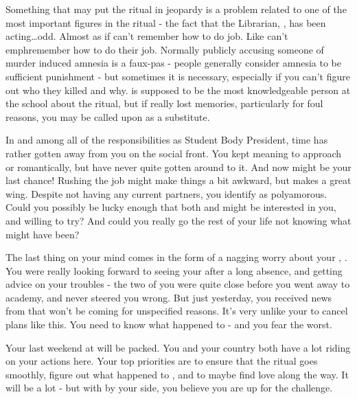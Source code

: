 \documentclass[char]{GL2020}
\begin{document}
Something that may put the ritual in jeopardy is a problem related to one of the most important figures in the ritual - the fact that the Librarian, \cLibrarian{}, has been acting\ldots odd. Almost as if \cLibrarian{\they} can't remember how to do \cLibrarian{\their} job. Like \cLibrarian{\they} can't emph{remember} how to do their job. Normally publicly accusing someone of murder induced amnesia is a faux-pas - people generally consider amnesia to be sufficient punishment - but sometimes it is necessary, especially if you can't figure out who they killed and why. \cLibrarian{} is supposed to be the most knowledgeable person at the school about the ritual, but if \cLibrarian{\they} really \cLibrarian{\have} lost \cLibrarian{\their} memories, particularly for foul reasons, you may be called upon as a substitute.

In and among all of the responsibilities as Student Body President, time has rather gotten away from you on the social front. You kept meaning to approach \cHeir{} or \cChupStudent{} romantically, but have never quite gotten around to it. And now might be your last chance! Rushing the job might make things a bit awkward, but \cInitiate{} makes a great wing\cInitiate{\person}. Despite not having any current partners, you identify as polyamorous. Could you possibly be lucky enough that both \cHeir{} and \cChupStudent{} might be interested in you, and willing to try? And could you really go the rest of your life not knowing what might have been?

The last thing on your mind comes in the form of a nagging worry about your \cHeadDiplomat{\auncle}, \cHeadDiplomat{}. You were really looking forward to seeing your \cHeadDiplomat{\auncle} after a long absence, and getting \cHeadDiplomat{\their} advice on your troubles - the two of you were quite close before you went away to academy, and \cHeadDiplomat{\they} never steered you wrong. But just yesterday, you received news from \cEbbPriest{} that \cHeadDiplomat{} won't be coming for unspecified reasons. It’s very unlike your \cHeadDiplomat{\auncle} to cancel plans like this. You need to know what happened to \cHeadDiplomat{\them} - and you fear the worst.

Your last weekend at \pSchool{} will be packed. You and your country both have a lot riding on your actions here. Your top priorities are to ensure that the ritual goes smoothly, figure out what happened to \cHeadDiplomat{\Auncle} \cHeadDiplomat{}, and to maybe find love along the way. It will be a lot - but with \cInitiate{} by your side, you believe you are up for the challenge.
\end{document}
